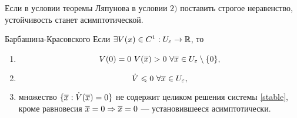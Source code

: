 \begin{ntc}
Если в условии теоремы Ляпунова в условии $2)$ поставить строгое неравенство, устойчивость станет асимптотической.
\end{ntc}

\begin{teo}{Барбашина-Красовского}
Если $\exists V(x) \in C^1 : U_\varepsilon \rightarrow \mathbb{R}$, то
\begin{enumerate}
\item 
\[
	V(0) = 0 \ V({\overline{x}}) > 0 \ \forall {\overline{x}} \in U_\varepsilon \setminus \{ 0 \},
\]
\item
\[
	\dot V \leqslant 0 \  \forall {\overline{x}} \in U_\varepsilon,
\]
\item множество $\{{\overline{x}} : \dot V ({\overline{x}}) = 0\}$ не содержит целиком решения системы \eqref{stable}, кроме равновесия ${\overline{x}} = 0 \Rightarrow {\overline{x}} = 0$ --- установившееся асимптотически.
\end{enumerate}
\end{teo}

